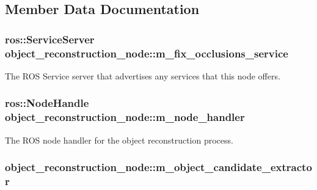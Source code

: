\subsection{\-Member \-Data \-Documentation}
\hypertarget{classobject__reconstruction__node_a0beb4c4e79ee822d4ca5bb320eb8ddfd}{
\subsubsection[{m\-\_\-fix\-\_\-occlusions\-\_\-service}]{\setlength{\rightskip}{0pt plus 5cm}ros\-::\-Service\-Server {\bf object\-\_\-reconstruction\-\_\-node\-::m\-\_\-fix\-\_\-occlusions\-\_\-service}}}\label{classobject__reconstruction__node_a0beb4c4e79ee822d4ca5bb320eb8ddfd}


\-The \-R\-O\-S \-Service server that advertises any services that this node offers. 

\hypertarget{classobject__reconstruction__node_ac4c5d38f03eefaea752963d27555c222}{
\subsubsection[{m\-\_\-node\-\_\-handler}]{\setlength{\rightskip}{0pt plus 5cm}ros\-::\-Node\-Handle {\bf object\-\_\-reconstruction\-\_\-node\-::m\-\_\-node\-\_\-handler}}}\label{classobject__reconstruction__node_ac4c5d38f03eefaea752963d27555c222}


\-The \-R\-O\-S node handler for the object reconstruction process. 

\hypertarget{classobject__reconstruction__node_a5c9dce10dc493b97dff5f1aac13a7501}{
\subsubsection[{m\-\_\-object\-\_\-candidate\-\_\-extractor}]{ {\bf object\-\_\-reconstruction\-\_\-node\-::m\-\_\-object\-\_\-candidate\-\_\-extractor}}}\label{classobject__reconstruction__node_a5c9dce10dc493b97dff5f1aac13a7501}


